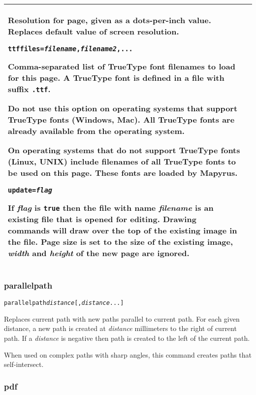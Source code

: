 \begin{longtable}{|p{4cm}|p{10cm}|}
Resolution for page, given as a dots-per-inch value.  Replaces
default value of screen resolution.

\vspace{10pt}
\texttt{ttffiles=\textit{filename},\textit{filename2},...}

Comma-separated list of TrueType font filenames
to load for this page.
A TrueType font is defined in a file
with suffix \texttt{.ttf}.

Do not use this option on operating systems that support
TrueType fonts (Windows, Mac).  All TrueType
fonts are already available from the operating system.

On operating systems that do not support TrueType fonts
(Linux, UNIX) include filenames of all TrueType
fonts to be used on this page.  These fonts are loaded
by Mapyrus.

\vspace{10pt}
\texttt{update=\textit{flag}}

If \textit{flag} is \texttt{true} then the file with name
\textit{filename} is an existing file that is opened for editing.
Drawing commands will draw over the top of the existing image
in the file.
Page size is set to the size of the existing image,
\textit{width} and \textit{height} of the new page are ignored.  \\

\hline

\end{longtable}

\subsubsection{parallelpath}

\begin{alltt}
parallelpath \textit{distance} [, \textit{distance} ...]
\end{alltt}

Replaces current path with new paths parallel to current path.
For each given distance, a new path is created at \textit{distance}
millimeters to the right of current path.  If a \textit{distance} is
negative then path is created to the left of the current path.

When used on complex paths with sharp angles, this command creates
paths that self-intersect.

\subsubsection{pdf}

